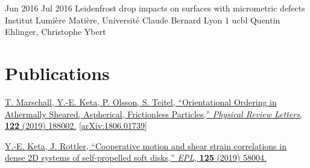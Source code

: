 \documentclass[letterpaper]{cvtemplate_en} %
\begin{document}
\begin{cvbody}
\cvitem
	{Jun 2016}
	{Jul 2016}
	{Leidenfrost drop impacts on surfaces with micrometric defects}
	{Institut Lumi\`ere Mati\`ere, Universit\'e Claude Bernard Lyon 1 }
	{ucbl}
	{Quentin Ehlinger, Christophe Ybert}

\end{cvbody}


\section{Publications}

\href{https://doi.org/10.1103/PhysRevLett.122.188002}{T. Marschall, Y.-E. Keta, P. Olsson, S. Teitel, ``Orientational Ordering in Athermally Sheared, Aspherical, Frictionless Particles,'' \textit{Physical Review Letters}, \textbf{122} (2019) 188002.} \href{https://arxiv.org/abs/1806.01739}{[arXiv:1806.01739]}

\href{https://doi.org/10.1209/0295-5075/125/58004}{Y.-E. Keta, J. Rottler, ``Cooperative motion and shear strain correlations in dense 2D systems of self-propelled soft disks,'' \textit{EPL}, \textbf{125} (2019) 58004.}\\

\end{document}
